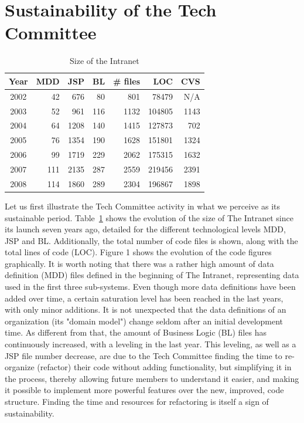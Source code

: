 \documentclass{sig-alt-release2}
\begin{document}
\section{Sustainability of the Tech Committee}\label{sec:techCommittee}
\begin{table}
	\centering
	\begin{tabular}{c|r|r|r|r|r|r}
		\hline
		\hline
		Year	& MDD	& JSP	& BL	& \# files	& LOC		& CVS	 \\
		\hline
		\hline
		2002 	& 42	& 676	& 80	& 801		& 78479 	& N/A	 \\ 
		\hline
		2003 	& 52	& 961	& 116	& 1132		& 104805 	& 1143	 \\ 
		\hline
		2004 	& 64	& 1208	& 140	& 1415		& 127873 	& 702	 \\ 
		\hline
		2005 	& 76	& 1354	& 190	& 1628		& 151801 	& 1324	 \\ 
		\hline
		2006 	& 99	& 1719	& 229	& 2062		& 175315 	& 1632	 \\ 
		\hline
		2007 	& 111	& 2135	& 287	& 2559		& 219456 	& 2391	 \\ 
		\hline
		2008 	& 114	& 1860	& 289	& 2304		& 196867 	& 1898	 \\ 
		\hline
		
		\hline
		\hline
	\end{tabular}
	\caption{Size of the Intranet}
	\label{tab:intranet-size}
\end{table} 

Let us first illustrate the Tech Committee activity in what we perceive as its sustainable period. Table~\ref{tab:intranet-size} shows the evolution of the size of The Intranet since its launch seven years ago, detailed for the different technological levels MDD, JSP and BL. Additionally, the total number of code files is shown, along with the total lines of code (LOC).  Figure 1 shows the evolution of the code figures graphically. It is worth noting that there was a rather high amount of data definition (MDD) files defined in the beginning of The Intranet, representing data used in the first three sub-systems. Even though more data definitions have been added over time, a certain saturation level has been reached in the last years, with only minor additions. It is not unexpected that the data definitions of an organization (its "domain model") change seldom after an initial development time. 
As different from that, the amount of Business Logic (BL) files has continuously increased, with a leveling in the last year.
This leveling, as well as a JSP file number decrease, are due to the Tech Committee finding the time to re-organize (refactor) their code without adding functionality, but simplifying it in the process, thereby allowing future members to understand it easier, and making it possible to implement more powerful features over the new, improved, code structure. Finding the time and resources for refactoring is itself a sign of sustainability.
\end{document}
